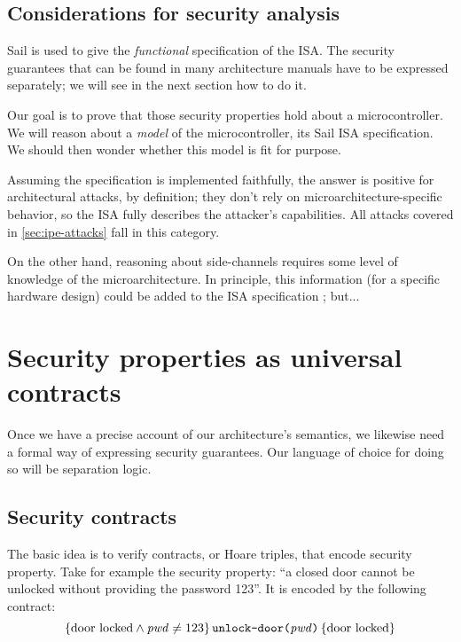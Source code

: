\subsection{Considerations for security analysis}

Sail is used to give the \emph{functional} specification of the ISA. The security guarantees that can be found in many architecture manuals have to be expressed separately; we will see in the next section how to do it.

Our goal is to prove that those security properties hold about a microcontroller. We will reason about a \emph{model} of the microcontroller, its Sail ISA specification. We should then wonder whether this model is fit for purpose.

Assuming the specification is implemented faithfully, the answer is positive for architectural attacks, by definition; they don't rely on microarchitecture-specific behavior, so the ISA fully describes the attacker's capabilities. All attacks covered in \cref{sec:ipe-attacks} fall in this category.

On the other hand, reasoning about side-channels requires some level of knowledge of the microarchitecture. In principle, this information (for a specific hardware design) could be added to the ISA specification ; but...

\section{Security properties as universal contracts}
\label{sec:universal-contracts}

Once we have a precise account of our architecture's semantics, we likewise need a formal way of expressing security guarantees. Our language of choice for doing so will be separation logic.

\subsection{Security contracts}

The basic idea is to verify contracts, or Hoare triples, that encode security property. Take for example the security property: ``a closed door cannot be unlocked without providing the password 123''. It is encoded by the following contract:
\[ \hoare
  {\text{door locked} \wedge \mathit{pwd} \neq 123}
  {\texttt{unlock-door(\(\mathit{pwd}\))}}
  {\text{door locked}} \]

